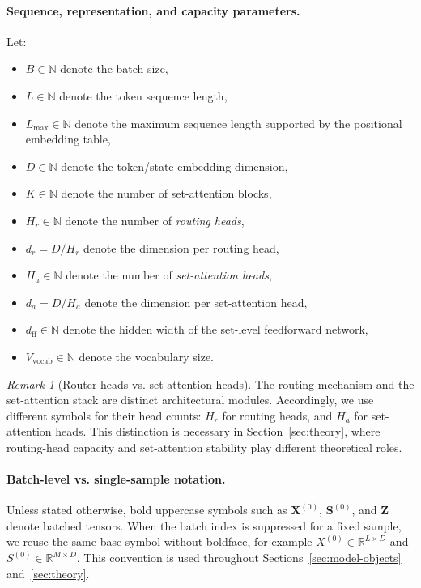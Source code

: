 \documentclass{article}
\theoremstyle{plain}
\theoremstyle{definition}
\theoremstyle{remark}
\newtheorem{remark}[theorem]{Remark}
\begin{document}
\paragraph{Sequence, representation, and capacity parameters.}
Let:
\begin{itemize}
    \item $B \in \mathbb{N}$ denote the batch size,
    \item $L \in \mathbb{N}$ denote the token sequence length,
    \item $L_{\max}\in\mathbb N$ denote the maximum sequence length supported by the positional embedding table,
    \item $D \in \mathbb{N}$ denote the token/state embedding dimension,
    \item $K \in \mathbb N$ denote the number of set-attention blocks,
    \item $H_r \in \mathbb{N}$ denote the number of \emph{routing heads},
    \item $d_r = D/H_r$ denote the dimension per routing head,
    \item $H_a \in \mathbb{N}$ denote the number of \emph{set-attention heads},
    \item $d_a = D/H_a$ denote the dimension per set-attention head,
    \item $d_{\mathrm{ff}} \in \mathbb{N}$ denote the hidden width of the set-level feedforward network,
    \item $V_{\mathrm{vocab}} \in \mathbb{N}$ denote the vocabulary size.
\end{itemize}

\begin{remark}[Router heads vs. set-attention heads]
\label{rem:head-notation}
The routing mechanism and the set-attention stack are distinct architectural modules. Accordingly, we use different symbols for their head counts: $H_r$ for routing heads, and $H_a$ for set-attention heads. This distinction is necessary in Section~\ref{sec:theory}, where routing-head capacity and set-attention stability play different theoretical roles.
\end{remark}

\paragraph{Batch-level vs. single-sample notation.}
Unless stated otherwise, bold uppercase symbols such as $\mathbf{X}^{(0)}$,
$\mathbf{S}^{(0)}$, and $\mathbf{Z}$ denote batched tensors. When the batch
index is suppressed for a fixed sample, we reuse the same base symbol without
boldface, for example $X^{(0)}\in\mathbb R^{L\times D}$ and
$S^{(0)}\in\mathbb R^{M\times D}$. This convention is used throughout
Sections~\ref{sec:model-objects} and~\ref{sec:theory}.
\end{document}
